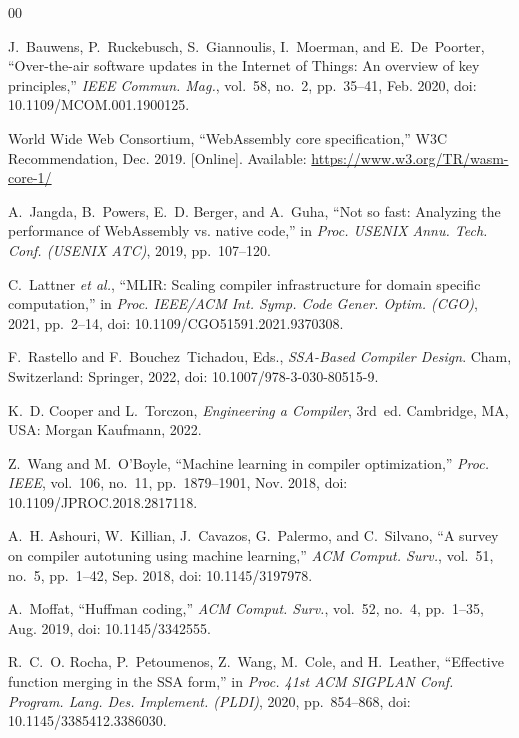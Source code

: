 \documentclass{ieeeaccess}
\begin{document}
\begin{thebibliography}{00}

J.~Bauwens, P.~Ruckebusch, S.~Giannoulis, I.~Moerman, and E.~De~Poorter, ``Over-the-air software updates in the Internet of Things: An overview of key principles,'' \emph{IEEE Commun. Mag.}, vol.~58, no.~2, pp.~35--41, Feb. 2020, doi: 10.1109/MCOM.001.1900125.

World Wide Web Consortium, ``WebAssembly core specification,'' W3C Recommendation, Dec. 2019. [Online]. Available: \url{https://www.w3.org/TR/wasm-core-1/}

A.~Jangda, B.~Powers, E.~D. Berger, and A.~Guha, ``Not so fast: Analyzing the performance of WebAssembly vs. native code,'' in \emph{Proc. USENIX Annu. Tech. Conf. (USENIX ATC)}, 2019, pp.~107--120.

C.~Lattner \emph{et al.}, ``MLIR: Scaling compiler infrastructure for domain specific computation,'' in \emph{Proc. IEEE/ACM Int. Symp. Code Gener. Optim. (CGO)}, 2021, pp.~2--14, doi: 10.1109/CGO51591.2021.9370308.

F.~Rastello and F.~Bouchez~Tichadou, Eds., \emph{SSA-Based Compiler Design}. Cham, Switzerland: Springer, 2022, doi: 10.1007/978-3-030-80515-9.

K.~D. Cooper and L.~Torczon, \emph{Engineering a Compiler}, 3rd~ed. Cambridge, MA, USA: Morgan Kaufmann, 2022.

Z.~Wang and M.~O'Boyle, ``Machine learning in compiler optimization,'' \emph{Proc. IEEE}, vol.~106, no.~11, pp.~1879--1901, Nov. 2018, doi: 10.1109/JPROC.2018.2817118.

A.~H. Ashouri, W.~Killian, J.~Cavazos, G.~Palermo, and C.~Silvano, ``A survey on compiler autotuning using machine learning,'' \emph{ACM Comput. Surv.}, vol.~51, no.~5, pp.~1--42, Sep. 2018, doi: 10.1145/3197978.

A.~Moffat, ``Huffman coding,'' \emph{ACM Comput. Surv.}, vol.~52, no.~4, pp.~1--35, Aug. 2019, doi: 10.1145/3342555.

R.~C.~O. Rocha, P.~Petoumenos, Z.~Wang, M.~Cole, and H.~Leather, ``Effective function merging in the SSA form,'' in \emph{Proc. 41st ACM SIGPLAN Conf. Program. Lang. Des. Implement. (PLDI)}, 2020, pp.~854--868, doi: 10.1145/3385412.3386030.


\end{thebibliography}
\end{document}
